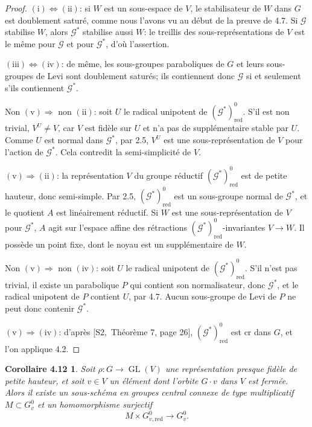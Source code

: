 \documentclass[11pt]{article}
\newcommand{\GL}{\operatorname{GL}}
\newcommand{\red}{\mathrm{red}}
\newtheorem*{corollaire412}{Corollaire 4.12}
\begin{document}
\begin{proof}
\((\mathrm i)\Leftrightarrow(\mathrm{ii})\): si \(W\) est un sous-espace de \(V\), le
stabilisateur de \(W\) dans \(G\) est doublement saturé, comme nous l'avons vu au début
de la preuve de 4.7. Si \(\mathcal G\) stabilise \(W\), alors \(\mathcal G^*\) stabilise
aussi \(W\): le treillis des sous-représentations de \(V\) est le même pour
\(\mathcal G\) et pour \(\mathcal G^*\), d'où l'assertion.

\((\mathrm{iii})\Leftrightarrow(\mathrm{iv})\): de même, les sous-groupes paraboliques
de \(G\) et leurs sous-groupes de Levi sont doublement saturés; ils contiennent donc
\(\mathcal G\) si et seulement s'ils contiennent \(\mathcal G^*\).

Non \((\mathrm v)\Rightarrow\) non \((\mathrm{ii})\): soit \(U\) le radical unipotent de
\((\mathcal G^*)^0_{\red}\). S'il est non trivial, \(V^U\ne V\), car \(V\) est fidèle
sur \(U\) et n'a pas de supplémentaire stable par \(U\). Comme \(U\) est normal dans
\(\mathcal G^*\), par 2.5, \(V^U\) est une sous-représentation de \(V\) pour l'action de
\(\mathcal G^*\). Cela contredit la semi-simplicité de \(V\).

\((\mathrm v)\Rightarrow(\mathrm{ii})\): la représentation \(V\) du groupe réductif
\((\mathcal G^*)^0_{\red}\) est de petite hauteur, donc semi-simple. Par 2.5,
\((\mathcal G^*)^0_{\red}\) est un sous-groupe normal de \(\mathcal G^*\), et le quotient
\(A\) est linéairement réductif. Si \(W\) est une sous-représentation de \(V\) pour
\(\mathcal G^*\), \(A\) agit sur l'espace affine des rétractions
\((\mathcal G^*)^0_{\red}\)-invariantes \(V\to W\). Il possède un point fixe, dont le
noyau est un supplémentaire de \(W\).

Non \((\mathrm v)\Rightarrow\) non \((\mathrm{iv})\): soit \(U\) le radical unipotent de
\((\mathcal G^*)^0_{\red}\). S'il n'est pas trivial, il existe un parabolique \(P\) qui
contient son normalisateur, donc \(\mathcal G^*\), et le radical unipotent de \(P\)
contient \(U\), par 4.7. Aucun sous-groupe de Levi de \(P\) ne peut donc contenir
\(\mathcal G^*\).

\((\mathrm v)\Rightarrow(\mathrm{iv})\): d'après \([\mathrm{S2},\) Théorème 7, page 26],
\((\mathcal G^*)^0_{\red}\) est \(\mathrm{cr}\) dans \(G\), et l'on applique 4.2.
\end{proof}

\begin{corollaire412}
Soit \(\rho:G\to\GL(V)\) une représentation presque fidèle de petite hauteur, et soit
\(v\in V\) un élément dont l'orbite \(G\cdot v\) dans \(V\) est fermée. Alors il existe un
sous-schéma en groupes central connexe de type multiplicatif \(M\subset G_v^0\) et un
homomorphisme surjectif
\[
  M\times G_{v,\red}^{0}\longrightarrow G_v^0.
\]
\end{corollaire412}
\end{document}
